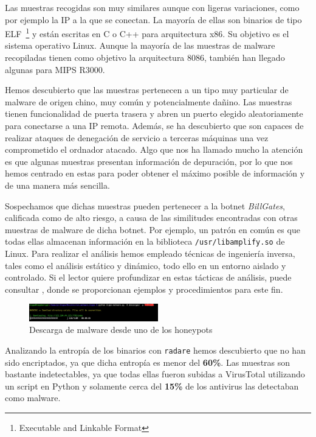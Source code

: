 \documentclass[journal]{IEEEtran}
\begin{document}
Las muestras recogidas son muy similares aunque con ligeras variaciones, como por ejemplo la IP a la que se conectan. La mayoría de ellas son binarios de tipo ELF~\footnote{Executable and Linkable Format} y están escritas en C o C++ para arquitectura x86. Su objetivo es el sistema operativo Linux. Aunque la mayoría de las muestras de malware recopiladas tienen como objetivo la arquitectura 8086, también han llegado algunas para MIPS R3000.

Hemos descubierto que las muestras pertenecen a un tipo muy particular de malware de origen chino, muy común y potencialmente dañino. Las muestras tienen funcionalidad de puerta trasera y abren un puerto elegido aleatoriamente para conectarse a una IP remota. Además, se ha descubierto que son capaces de realizar ataques de denegación de servicio a terceras máquinas una vez comprometido el ordnador atacado. Algo que nos ha llamado mucho la atención es que algunas muestras presentan información de depuración, por lo que nos hemos centrado en estas para poder obtener el máximo posible de información y de una manera más sencilla.

Sospechamos que dichas muestras pueden pertenecer a la botnet \textit{BillGates}, calificada como de alto riesgo, a causa de las similitudes encontradas con otras muestras de malware de dicha botnet. Por ejemplo, un patrón en común es que todas ellas almacenan información en la biblioteca {\tt /usr/libamplify.so} de Linux. Para realizar el análisis hemos empleado técnicas de ingeniería inversa, tales como el análisis estático y dinámico, todo ello en un entorno aislado y controlado. Si el lector quiere profundizar en estas tácticas de análisis, puede consultar \cite{honeywell2004know}, donde se proporcionan ejemplos y procedimientos para este fin.

\begin{figure}
\centering
\includegraphics[width=0.5\textwidth]{img/download_malware}
\caption{Descarga de malware desde uno de los honeypots}
\label{fig:download_malware}
\end{figure}

Analizando la entropía de los binarios con {\tt radare} hemos descubierto que no han sido encriptados, ya que dicha entropía es menor del \textbf{60\%}. Las muestras son bastante indetectables, ya que todas ellas fueron subidas a VirusTotal utilizando un script en Python y solamente cerca del \textbf{15\%} de los antivirus las detectaban como malware.
\end{document}
